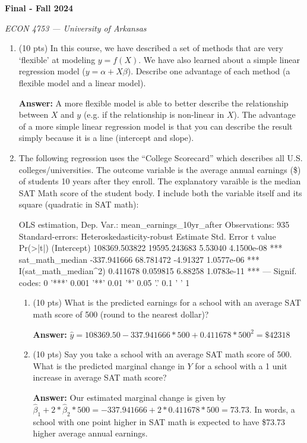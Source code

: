 \documentclass[12pt]{article}
\newcommand{\answer}[1]{{\color{blue_winged_teal}\textbf{Answer:} #1}}
\newcommand{\pts}[1]{{\color{zinc500}(#1 pts)}}
\begin{document}
\begin{center}
  {\Huge\bf Final - Fall 2024}
  
  \smallskip
  {\large\it ECON 4753 — University of Arkansas}
\end{center}

\vspace{5mm}

\begin{enumerate}
  \item \pts{10} In this course, we have described a set of methods that are very `flexible' at modeling $y = f(X)$. We have also learned about a simple linear regression model ($y = \alpha + X \beta$). Describe one advantage of each method (a flexible model and a linear model).
  
  \answer{
    A more flexible model is able to better describe the relationship between $X$ and $y$ (e.g. if the relationship is non-linear in $X$). The advantage of a more simple linear regression model is that you can describe the result simply because it is a line (intercept and slope).
  }

  \bigskip
  \item The following regression uses the ``College Scorecard'' which describes all U.S. colleges/universities. The outcome variable is the average annual earnings (\$) of students 10 years after they enroll. The explanatory varaible is the median SAT Math score of the student body. I include both the variable itself and its square (quadratic in SAT math):
  \begin{codeblock}[{}]
OLS estimation, Dep. Var.: mean_earnings_10yr_after
Observations: 935
Standard-errors: Heteroskedasticity-robust 
                          Estimate   Std. Error  t value   Pr(>|t|)    
(Intercept)          108369.503822 19595.243683  5.53040 4.1500e-08 ***
sat_math_median        -337.941666    68.781472 -4.91327 1.0577e-06 ***
I(sat_math_median^2)      0.411678     0.059815  6.88258 1.0783e-11 ***
---
Signif. codes:  0 '***' 0.001 '**' 0.01 '*' 0.05 '.' 0.1 ' ' 1
  \end{codeblock}

  \begin{enumerate}[leftmargin = 2em]
    \item \pts{10} What is the predicted earnings for a school with an average SAT math score of 500 (round to the nearest dollar)? 
    
    \answer{
      $\hat{y} = 108369.50 - 337.941666 * 500 + 0.411678 * 500^2 = \$42318$
    }
    
    \item \pts{10} Say you take a school with an average SAT math score of 500. What is the predicted marginal change in $Y$ for a school with a 1 unit increase in average SAT math score?
    
    \answer{
      Our estimated marginal change is given by $\hat{\beta}_1 + 2 * \hat{\beta}_2 * 500 = -337.941666 + 2 * 0.411678 * 500 = 73.73$. In words, a school with one point higher in SAT math is expected to have \$73.73 higher average annual earnings. 
    }
  \end{enumerate}
\end{enumerate}
  
\end{document}
